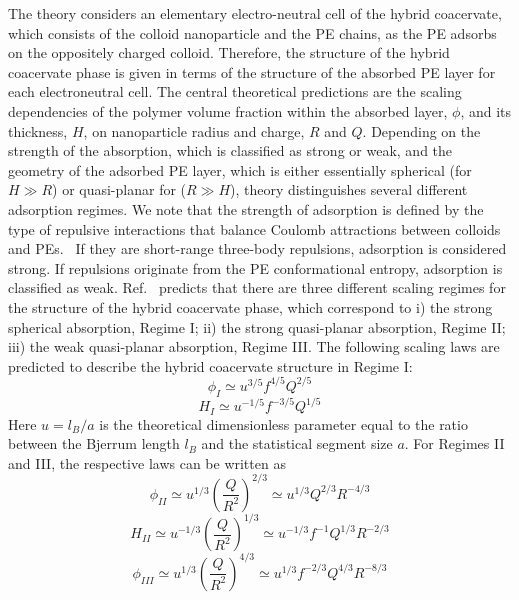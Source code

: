 \documentclass[journal=mamobx, manuscript=article]{achemso}
\begin{document}
The theory considers an elementary electro-neutral cell of the hybrid coacervate, which consists of the colloid nanoparticle and the PE chains, as the PE adsorbs on the oppositely charged colloid. Therefore, the structure of the hybrid coacervate phase is given in terms of the structure of the absorbed PE layer for each electroneutral cell. The central theoretical predictions are the scaling dependencies of the polymer volume fraction within the absorbed layer, $\phi$, and its thickness, $H$, on nanoparticle radius and charge, $R$ and $Q$. Depending on the strength of the absorption, which is classified as strong or weak, and the geometry of the adsorbed PE layer, which is either essentially spherical (for $H \gg R$) or quasi-planar for ($R \gg H$), theory distinguishes several different adsorption regimes.  We note that the strength of adsorption is defined by the type of repulsive interactions that balance Coulomb attractions between colloids and PEs.~\cite{artem2022hybrid} If they are short-range three-body repulsions, adsorption is considered strong. If repulsions originate from the PE conformational entropy, adsorption is classified as weak. Ref.~ predicts that there are three different scaling regimes for the structure of the hybrid coacervate phase, which correspond to i) the strong spherical absorption, Regime I; ii) the strong quasi-planar absorption, Regime II; iii) the weak quasi-planar absorption, Regime III. The following scaling laws are predicted to describe the hybrid coacervate structure in Regime I:
\begin{equation}
\phi_{I} \simeq u^{3/5}f^{4/5}Q^{2/5}
\label{eq:region1-phi}
\end{equation}
\begin{equation}
H_{I} \simeq u^{-1/5}f^{-3/5}Q^{1/5}
\label{eq:region1-H}
\end{equation}
Here $u = l_B/  a$ is the theoretical dimensionless parameter equal to the ratio between the Bjerrum length $l_B$ and the statistical segment size $a$. For Regimes II and III, the respective laws can be written as
\begin{equation}
\label{eq:region2-phi}
\phi_{II} \simeq u^{1/3} \left( \frac{Q}{R^2} \right)^{2/3} \simeq u^{1/3}Q^{2/3}R^{-4/3}
\end{equation}
\begin{equation}
\label{eq:region2-H}
H_{II}  \simeq u^{-1/3} \left( \frac{Q}{R^2} \right)^{1/3} \simeq u^{-1/3}f^{-1}Q^{1/3}R^{-2/3}
\end{equation}
\begin{equation}
\label{eq:region3-phi}
\phi_{III}  \simeq u^{1/3} \left( \frac{Q}{R^2} \right)^{4/3} \simeq u^{1/3}f^{-2/3}Q^{4/3}R^{-8/3}
\end{equation}
\end{document}
